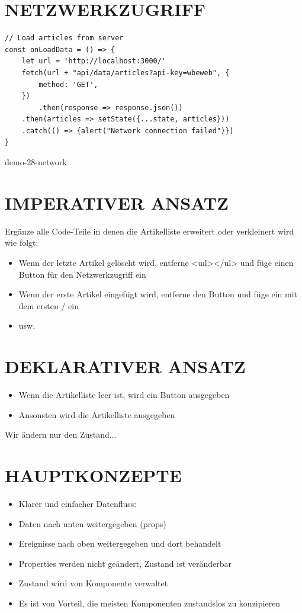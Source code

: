 \documentclass[10pt]{article}
\begin{document}
\section*{NETZWERKZUGRIFF}
\begin{verbatim}
// Load articles from server
const onLoadData = () => {
    let url = 'http://localhost:3000/'
    fetch(url + "api/data/articles?api-key=wbeweb", {
        method: 'GET',
    })
        .then(response => response.json())
    .then(articles => setState({...state, articles}))
    .catch(() => {alert("Network connection failed")})
}
\end{verbatim}

demo-28-network

\section*{IMPERATIVER ANSATZ}
Ergänze alle Code-Teile in denen die Artikelliste erweitert oder verkleinert wird wie folgt:

\begin{itemize}
  \item Wenn der letzte Artikel gelöscht wird, entferne <uıl></ul> und füge einen Button für den Netzwerkzugriff ein
  \item Wenn der erste Artikel eingefügt wird, entferne den Button und füge ein  mit dem ersten / ein
  \item usw.
\end{itemize}

\section*{DEKLARATIVER ANSATZ}
\begin{itemize}
  \item Wenn die Artikelliste leer ist, wird ein Button ausgegeben
  \item Ansonsten wird die Artikelliste ausgegeben
\end{itemize}

Wir ändern nur den Zustand...

\section*{HAUPTKONZEPTE}
\begin{itemize}
  \item Klarer und einfacher Datenfluss:
  \item Daten nach unten weitergegeben (props)
  \item Ereignisse nach oben weitergegeben und dort behandelt
  \item Properties werden nicht geändert, Zustand ist veränderbar
  \item Zustand wird von Komponente verwaltet
  \item Es ist von Vorteil, die meisten Komponenten zustandslos zu konzipieren
\end{itemize}
\end{document}
